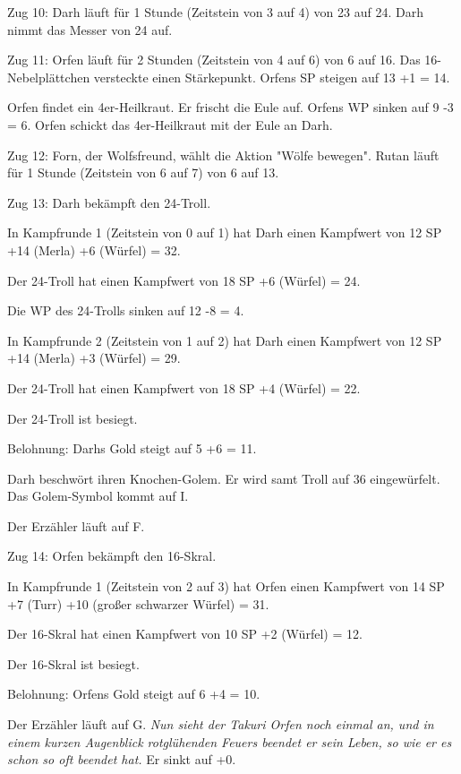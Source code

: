 \documentclass[10pt, a4paper, oneside]{book}
\begin{document}
{Zug 10: Darh läuft für 1 Stunde (Zeitstein von 3 auf 4) von 23 auf 24. Darh nimmt das Messer von 24 auf.



Zug 11: Orfen läuft für 2 Stunden (Zeitstein von 4 auf 6) von 6 auf 16. Das 16-Nebelplättchen versteckte einen Stärkepunkt. Orfens SP steigen auf 13 +1 = 14.

Orfen findet ein 4er-Heilkraut. Er frischt die Eule auf. Orfens WP sinken auf 9 -3 = 6. Orfen schickt das 4er-Heilkraut mit der Eule an Darh.



Zug 12: Forn, der Wolfsfreund, wählt die Aktion "Wölfe bewegen". Rutan läuft für 1 Stunde (Zeitstein von 6 auf 7) von 6 auf 13.



Zug 13: Darh bekämpft den 24-Troll.

In Kampfrunde 1 (Zeitstein von 0 auf 1) hat Darh einen Kampfwert von 12 SP +14 (Merla) +6 (Würfel) = 32.

Der 24-Troll hat einen Kampfwert von 18 SP +6 (Würfel) = 24.

Die WP des 24-Trolls sinken auf 12 -8 = 4.

In Kampfrunde 2 (Zeitstein von 1 auf 2) hat Darh einen Kampfwert von 12 SP +14 (Merla) +3 (Würfel) = 29.

Der 24-Troll hat einen Kampfwert von 18 SP +4 (Würfel) = 22.

Der 24-Troll ist besiegt.

Belohnung: Darhs Gold steigt auf 5 +6 = 11.

Darh beschwört ihren Knochen-Golem. Er wird samt Troll auf 36 eingewürfelt. Das Golem-Symbol kommt auf I.

Der Erzähler läuft auf F.



Zug 14: Orfen bekämpft den 16-Skral.

In Kampfrunde 1 (Zeitstein von 2 auf 3) hat Orfen einen Kampfwert von 14 SP +7 (Turr) +10 (großer schwarzer Würfel) = 31.

Der 16-Skral hat einen Kampfwert von 10 SP +2 (Würfel) = 12.

Der 16-Skral ist besiegt.

Belohnung: Orfens Gold steigt auf 6 +4 = 10.

Der Erzähler läuft auf G. \textit{Nun sieht der Takuri Orfen noch einmal an, und in einem kurzen Augenblick rotglühenden Feuers beendet er sein Leben, so wie er es schon so oft beendet hat.} Er sinkt auf +0.

}
\end{document}
